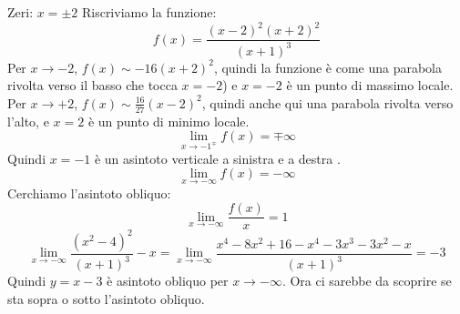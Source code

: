 Zeri: $x= \pm 2$\newline
Riscriviamo la funzione:
\[
    f(x) = \frac{(x-2)^2 (x+2)^2}{(x+1)^3}
\]
Per $x \rightarrow  -2$, $f(x) \sim -16(x+2)^2$, quindi la funzione è come una parabola rivolta verso il basso che tocca $x=-2$) e $x=-2$ è un punto di massimo locale.\newline
Per $x \rightarrow +2$, $f(x) \sim \frac{16}{27} (x-2)^2 $, quindi anche qui una parabola rivolta verso l'alto, e $x=2$ è un punto di minimo locale.
\[
    \lim_{x\rightarrow -1^{\mp}} f(x) = \mp\infty
\]
Quindi $x= -1$ è un asintoto verticale a sinistra e a destra .
\[
    \lim_{x\rightarrow -\infty} f(x) = -\infty
\]
Cerchiamo l'asintoto obliquo:
\[
    \lim_{x\rightarrow -\infty} \frac{f(x)}{x} = 1
\]
\[
    \lim_{x\rightarrow -\infty} \frac{(x^2-4)^2}{(x+1)^3} - x = \lim_{x\rightarrow -\infty} \frac{x^4-8x^2+16 - x^4-3x^3-3x^2-x}{(x+1)^3}= -3
\]
Quindi $y=x-3$ è asintoto obliquo per $x \rightarrow -\infty$. Ora ci sarebbe da scoprire se sta sopra o sotto l'asintoto obliquo.
\newpage
